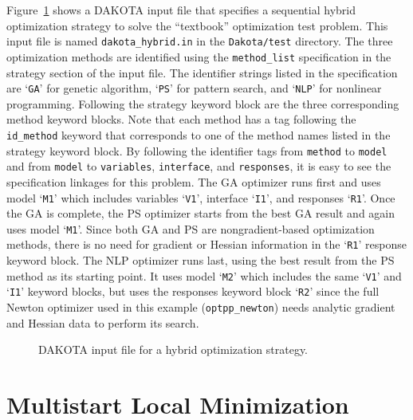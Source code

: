 Figure~\ref{strat:figure01} shows a DAKOTA input file that specifies
a sequential hybrid optimization strategy to solve the
``textbook'' optimization test problem. This input file is named
\texttt{dakota\_hybrid.in} in the \texttt{Dakota/test} directory.
The three optimization methods are identified using the
\texttt{method\_list} specification in the strategy section of the
input file. The identifier strings listed in the specification are
`\texttt{GA}' for genetic algorithm, `\texttt{PS}' for pattern search,
and `\texttt{NLP}' for nonlinear programming. Following the strategy
keyword block are the three corresponding method keyword blocks. Note
that each method has a tag following the \texttt{id\_method} keyword
that corresponds to one of the method names listed in the strategy
keyword block. By following the identifier tags from \texttt{method}
to \texttt{model} and from \texttt{model} to \texttt{variables},
\texttt{interface}, and \texttt{responses}, it is easy to see the
specification linkages for this problem. The GA optimizer runs first
and uses model `\texttt{M1}' which includes variables `\texttt{V1}',
interface `\texttt{I1}', and responses `\texttt{R1}'. Once the GA is
complete, the PS optimizer starts from the best GA result and again
uses model `\texttt{M1}'. Since both GA and PS are nongradient-based
optimization methods, there is no need for gradient or Hessian
information in the `\texttt{R1}' response keyword block. The NLP
optimizer runs last, using the best result from the PS method as its
starting point.  It uses model `\texttt{M2}' which includes the same
`\texttt{V1}' and `\texttt{I1}' keyword blocks, but uses the responses
keyword block `\texttt{R2}' since the full Newton optimizer used in
this example (\texttt{optpp\_newton}) needs analytic gradient and
Hessian data to perform its search.
\begin{figure}
  \centering
  \begin{bigbox}
    \begin{tiny}
    \end{tiny}
  \end{bigbox}
  \caption{DAKOTA input file for a hybrid optimization strategy.}
  \label{strat:figure01}
\end{figure}

\section{Multistart Local Minimization}\label{strat:multistart}

